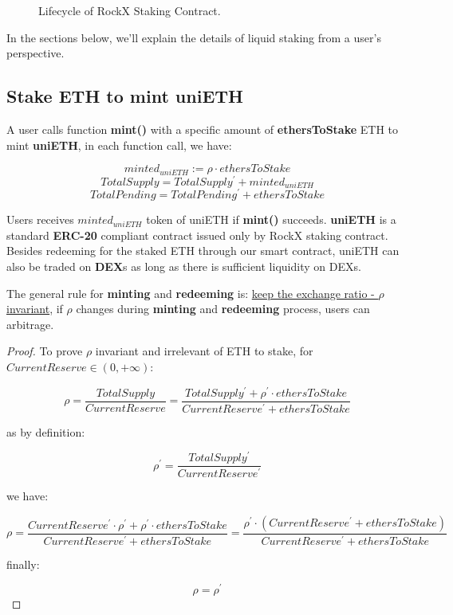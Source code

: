 \documentclass{article}
\begin{document}
\begin{figure}
\begin{center}
\end{center}
\caption{Lifecycle of RockX Staking Contract.}
\end{figure}

In the sections below, we'll explain the details of liquid staking from a user's perspective.

\subsection{Stake ETH to mint uniETH}
A user calls function \textbf{mint()} with a specific amount of \textbf{ethersToStake} ETH to mint \textbf{uniETH}, in each function call, we have:

\begin{theorem}
\label{Mint}
\[minted_{uniETH} := \rho \cdot ethersToStake \]
\[TotalSupply = TotalSupply^{\prime} + minted_{uniETH} \]
\[TotalPending = TotalPending^{\prime} + ethersToStake\]
\end{theorem}

Users receives \underline{$minted_{uniETH}$} token of uniETH  if \textbf{mint()} succeeds. \textbf{uniETH} is a standard \textbf{ERC-20} compliant contract issued only by RockX staking contract. Besides redeeming for the staked ETH through our smart contract, uniETH can also be traded on \textbf{DEX}s as long as there is sufficient liquidity on DEXs.

The general rule for \textbf{minting} and \textbf{redeeming} is: \underline{keep the exchange ratio - $\rho$ invariant}, if $\rho$ changes during \textbf{minting} and \textbf{redeeming} process, users can arbitrage.

\begin{proof}
To prove $\rho$ invariant and irrelevant of ETH to stake, for $CurrentReserve \in (0, +\infty)$:

\[\rho = \frac{TotalSupply}{CurrentReserve} = \frac{TotalSupply^{\prime} + \rho^{\prime} \cdot ethersToStake}{CurrentReserve^{\prime} + ethersToStake}\]

as by definition:

\[\rho^{\prime} = \frac{TotalSupply^{\prime}}{CurrentReserve^{\prime}}\]

we have:

\[\rho=\frac{CurrentReserve^{\prime} \cdot \rho^{\prime}  + \rho^{\prime} \cdot ethersToStake}{CurrentReserve^{\prime} + ethersToStake} = \frac{\rho^{\prime} \cdot (CurrentReserve^{\prime} + ethersToStake)}{CurrentReserve^{\prime} + ethersToStake} \]

finally:

\[\rho = \rho^{\prime}\]

\end{proof}
\end{document}
